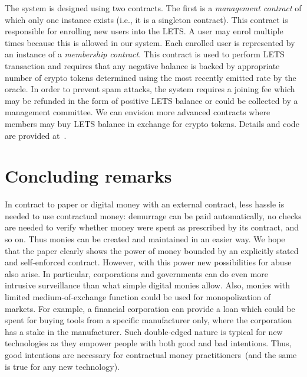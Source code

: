 \documentclass[]{llncs}   %
\begin{document}
The system is designed using two contracts. The first is a {\em management contract} of which only one instance exists (i.e., it is a singleton contract). This contract is responsible for enrolling new users into the LETS. A user may enrol multiple times because this is allowed in our system. Each enrolled user is represented by an instance of a {\em membership contract}. This contract is used to perform LETS transaction and requires that any negative balance is backed by appropriate number of crypto tokens determined using the most recently emitted rate by the oracle. In order to prevent spam attacks, the system requires a joining fee which may be refunded in the form of positive LETS balance or could be collected by a management committee. 
We can envision more advanced contracts where members may buy LETS balance in exchange for crypto tokens. 
 Details and code are provided at~\cite{lets-trustless}.


\section{Concluding remarks}
\label{sec-conslusion}

In contract to paper or digital money with an external contract, less hassle is needed to use contractual money: demurrage can be paid automatically, no checks are needed to verify whether money were spent as prescribed
by its contract, and so on. Thus monies can be created and maintained in an easier way. We hope that the paper clearly shows the power of money bounded by an explicitly stated and self-enforced contract. However, with this power new possibilities for abuse also arise. In particular, corporations and governments can do even more intrusive surveillance than what simple digital monies allow. Also, monies with limited medium-of-exchange function could be used for monopolization of markets. For example, a financial corporation can provide a loan which could be spent for buying tools from a specific manufacturer only, where the corporation has a stake in the manufacturer. Such double-edged nature is typical for new technologies as they empower people with both good and bad intentions. Thus, good intentions are necessary for contractual money practitioners~(and the same is true for any new technology).



\end{document}
